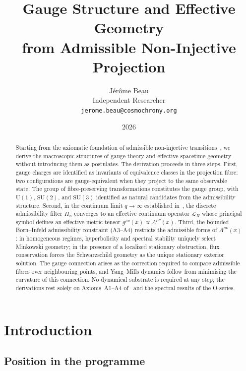 \documentclass[11pt,a4paper]{article}
\title{Gauge Structure and Effective Geometry\\
from Admissible Non-Injective Projection}
\author{J\'er\^ome Beau\\
\small Independent Researcher\\
\small \texttt{jerome.beau@cosmochrony.org}}
\date{2026}
\begin{document}
  \maketitle

  \begin{abstract}
    Starting from the axiomatic foundation of admissible non-injective
    transitions~\cite{FoundationM}, we derive the macroscopic structures of gauge
    theory and effective spacetime geometry without introducing them as postulates.
    The derivation proceeds in three steps.
    First, gauge charges are identified as invariants of equivalence classes in
    the projection fibre: two configurations are gauge-equivalent when they project
    to the same observable state.
    The group of fibre-preserving transformations constitutes the gauge group,
    with $\mathrm{U}(1)$, $\mathrm{SU}(2)$, and $\mathrm{SU}(3)$ identified as
    natural candidates from the admissibility structure.
    Second, in the continuum limit $q \to \infty$ established in~\cite{FoundationM},
    the discrete admissibility filter $\Pi_n$ converges to an effective continuum
    operator $\mathcal{L}_\Pi$ whose principal symbol defines an effective metric
    tensor $g^{\mu\nu}(x) \propto A^{\mu\nu}(x)$.
    Third, the bounded Born--Infeld admissibility constraint (A3--A4) restricts
    the admissible forms of $A^{\mu\nu}(x)$: in homogeneous regimes, hyperbolicity
    and spectral stability uniquely select Minkowski geometry; in the presence of a
    localized stationary obstruction, flux conservation forces the Schwarzschild
    geometry as the unique stationary exterior solution.
    The gauge connection arises as the correction required to compare admissible
    fibres over neighbouring points, and Yang--Mills dynamics follow from minimising
    the curvature of this connection.
    No dynamical substrate is required at any step; the derivations rest solely on
    Axioms~A1--A4 of~\cite{FoundationM} and the spectral results of the O-series.
  \end{abstract}

  \section{Introduction}
    \label{sec:intro}

    \subsection*{Position in the programme}
\end{document}
